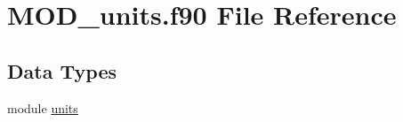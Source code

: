 \hypertarget{MOD__units_8f90}{\section{M\-O\-D\-\_\-units.\-f90 File Reference}
\label{MOD__units_8f90}
}
\subsection*{Data Types}
\begin{DoxyCompactItemize}
\item 
module \hyperlink{classunits}{units}
\end{DoxyCompactItemize}
